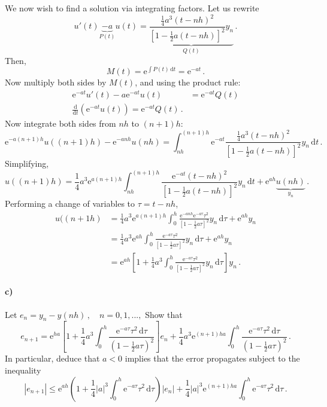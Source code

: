 \documentclass[10pt,letterpaper]{article}
\providecommand{\abs}[1]{\left\lvert#1\right\rvert}
\def\d{\mathrm{d}}
\def\e{\mathrm{e}}
\begin{document}
We now wish to find a solution via integrating factors. Let us rewrite
\[
u'(t)\underbrace{-a}_{\displaystyle P(t)}u(t)=\underbrace{\frac{\frac{1}{4}a^3(t-nh)^2}{\left[1-\frac{1}{2}a(t-nh)\right]^2}y_n}_{\displaystyle Q(t)}\,.
\]
Then,
\[
M(t)=\e^{\int P(t)\,\d t}=\e^{-at}\,.
\]
Now multiply both sides by $M(t)$, and using the product rule:
\begin{align*}
\e^{-at}u'(t)-a\e^{-at}u(t)&=\e^{-at}Q(t)\\
\frac{\d}{\d t}\left(\e^{-at}u(t)\right)=\e^{-at}Q(t)\,.
\end{align*}
Now integrate both sides from $nh$ to $(n+1)h$:
\[
\e^{-a(n+1)h}u((n+1)h)-\e^{-anh}u(nh)=\int_{nh}^{(n+1)h}\e^{-at}\frac{\frac{1}{4}a^3(t-nh)^2}{\left[1-\frac{1}{2}a(t-nh)\right]^2}y_n\,\d t\,.
\]
Simplifying,
\[
u((n+1)h)=\frac{1}{4}a^3\e^{a(n+1)h}\int_{nh}^{(n+1)h}\frac{\e^{-at}(t-nh)^2}{\left[1-\frac{1}{2}a(t-nh)\right]^2}y_n\,\d t
+\e^{ah}\underbrace{u(nh)}_{\displaystyle y_n}\,.
\]
Performing a change of variables to $\tau=t-nh$,
\begin{align*}
u((n+1h)&=\frac{1}{4}a^3\e^{a(n+1)h}\int_0^h\frac{\e^{-anh}\e^{-a\tau}\tau^2}{\left[1-\frac{1}{2}a\tau\right]^2}y_n\,\d\tau+\e^{ah}y_n\\
&=\frac{1}{4}a^3\e^{ah}\int_0^h\frac{\e^{-a\tau}\tau^2}{\left[1-\frac{1}{2}a\tau\right]^2}y_n\,\d\tau+\e^{ah}y_n\\
&=\e^{ah}\left[1+\frac{1}{4}a^3\int_0^h\frac{\e^{-a\tau}\tau^2}{\left[1-\frac{1}{2}a\tau\right]^2}y_n\,\d\tau\right]y_n\,.
\end{align*}

\paragraph*{c)} Let $e_n=y_n-y(nh)\,,\quad n=0,1,...,$ Show that 
\[
e_{n+1}=\e^{ha}\left[1+\frac{1}{4}a^3\int_0^h\frac{\e^{-a\tau}\tau^2\,\d\tau}{(1-\frac{1}{2}a\tau)^2}\right]e_n
+\frac{1}{4}a^3\e^{(n+1)ha}\int_0^h\frac{\e^{-a\tau}\tau^2\,\d\tau}{(1-\frac{1}{2}a\tau)^2}\,.
\]
In particular, deduce that $a<0$ implies that the error propagates subject to the inequality
\[
\abs{e_{n+1}}\leq \e^{ah}\left(1+\frac{1}{4}\abs{a}^3\int_0^h\e^{-a\tau}\tau^2\,\d\tau\right)\abs{e_n}
+\frac{1}{4}\abs{a}^3\e^{(n+1)ha}\int_0^h\e^{-a\tau}\tau^2\,\d\tau\,.
\]
\end{document}
